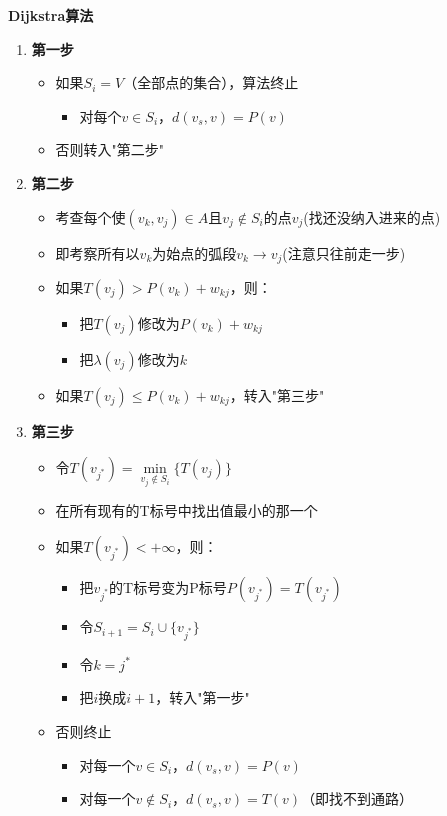 \begin{enumerate}
\begin{thmbox}{\textbf{Dijkstra算法}}{}
\begin{itemize}
\begin{enumerate}[label=\textbf{步骤 \arabic*：}, leftmargin=*]
			\item \textbf{第一步}
			\begin{itemize}
				\item 如果$S_i = V$（全部点的集合），算法终止
				\begin{itemize}
					\item 对每个$v \in S_i$，$d(v_s,v) = P(v)$
				\end{itemize}
				\item 否则转入"第二步"
			\end{itemize}
			
			\item \textbf{第二步}
			\begin{itemize}
				\item 考查每个使$(v_k,v_j) \in A$且$v_j \notin S_i$的点$v_j$(找还没纳入进来的点)
				\item 即考察所有以$v_k$为始点的弧段$v_k \to v_j$(注意只往前走一步)
				\item 如果$T(v_j) > P(v_k) + w_{kj}$，则：
				\begin{itemize}
					\item 把$T(v_j)$修改为$P(v_k) + w_{kj}$
					\item 把$\lambda(v_j)$修改为$k$
				\end{itemize}
				\item 如果$T(v_j) \leq P(v_k) + w_{kj}$，转入"第三步"
			\end{itemize}
			
			\item \textbf{第三步}
			\begin{itemize}
				\item 令$T(v_{j^*}) = \min\limits_{v_j \notin S_i} \{T(v_j)\}$
				\item 在所有现有的T标号中找出值最小的那一个
				\item 如果$T(v_{j^*}) < +\infty$，则：
				\begin{itemize}
					\item 把$v_{j^*}$的T标号变为P标号$P(v_{j^*}) = T(v_{j^*})$
					\item 令$S_{i+1} = S_i \cup \{v_{j^*}\}$
					\item 令$k = j^*$
					\item 把$i$换成$i+1$，转入"第一步"
				\end{itemize}
				\item 否则终止
				\begin{itemize}
					\item 对每一个$v \in S_i$，$d(v_s,v) = P(v)$
					\item 对每一个$v \notin S_i$，$d(v_s,v) = T(v)$（即找不到通路）
				\end{itemize}
			\end{itemize}
		\end{enumerate}
	\end{itemize}
	\end{thmbox}
		\end{enumerate}


